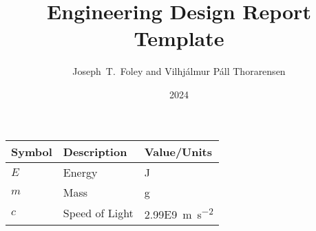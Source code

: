 \documentclass[showtrims]{rubook}
\title{Engineering Design Report Template}
\author{Joseph~T.~Foley and Vilhjálmur Páll Thorarensen}
\date{2024}{1}{31}%
\begin{document}
\maketitle{}
\disableindents{}%
\copyrightpage{}

\tableofcontents{}
\listoffigures{}
\listoftables{}
\begin{tabular}{lll}\toprule
  Symbol &Description &Value/Units\\\midrule
  $E$ &Energy &\si{\joule}\\ %
  $m$ &Mass &\si{\gram}\\ %
  $c$ &Speed of Light &\SI{2.99E9}{\meter\per\square\second}\\\bottomrule
\end{tabular}
\end{document}
